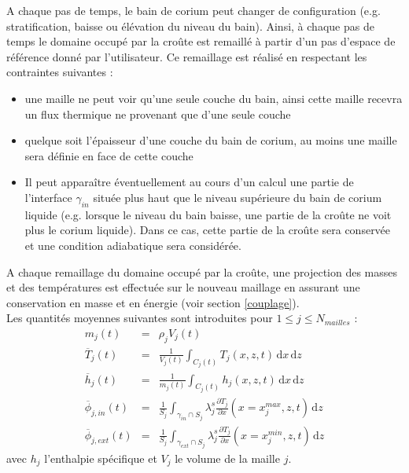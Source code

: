 A chaque pas de temps, le bain de corium peut changer de configuration (e.g. stratification, baisse ou élévation du niveau du bain). Ainsi, à chaque pas de temps le domaine occupé par la croûte est remaillé à partir d'un pas d'espace de référence donné par l'utilisateur. Ce remaillage est réalisé en respectant les contraintes suivantes :
\begin{itemize}
    \item une maille ne peut voir qu'une seule couche du bain, ainsi cette maille recevra un flux thermique ne provenant que d'une seule couche
    \item quelque soit l'épaisseur d'une couche du bain de corium, au moins une maille sera définie en face de cette couche
    \item  Il peut apparaître éventuellement au cours d'un calcul une partie de l'interface $\gamma_{in}$ située plus haut que le niveau supérieure du bain de corium liquide (e.g. lorsque le niveau du bain baisse, une partie de la croûte ne voit plus le corium liquide). Dans ce cas, cette partie de la croûte sera conservée et une condition adiabatique sera considérée.\\
\end{itemize}

A chaque remaillage du domaine occupé par la croûte, une projection des masses et des températures est effectuée sur le nouveau maillage en assurant une conservation en masse et en énergie (voir section \ref{couplage}).\\

Les quantités moyennes suivantes sont introduites pour $1 \leq j\leq N_{mailles}$ :
\begin{eqnarray}
m_{j}(t) &=& \rho_j  V_j(t) \\
\overline{T}_{j}(t) &=& \frac{1}{V_j(t)} \int_{C_j(t)} T_{j}(x,z,t)\,\mathrm{d}x\, \mathrm{d}z\\
\overline{h}_j(t) &=& \frac{1}{m_j(t)} \int_{C_j(t)} h_j(x,z,t)\,\mathrm{d}x\, \mathrm{d}z\\
\overline{\phi}_{j,in}(t) &=& \frac{1}{S_j}\int_{\gamma_{in}\cap S_j}\lambda_j^s \frac{\partial T_{j}}{\partial x}(x=x_j^{max},z,t)\, \mathrm{d}z  \label{eq:phi_j_in}\\
\overline{\phi}_{j,ext}(t) &=& \frac{1}{S_j}\int_{\gamma_{ext}\cap S_j}\lambda_j^s \frac{\partial T_{j}}{\partial x} (x=x_j^{min},z,t)\, \mathrm{d}z  \label{eq:phi_j_ext}
\end{eqnarray}
avec $h_j$ l'enthalpie spécifique et $V_j$ le volume de la maille $j$.\\

